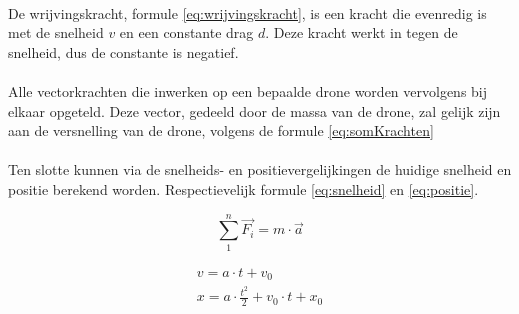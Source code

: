 \\
De wrijvingskracht, formule \ref{eq:wrijvingskracht}, is een kracht die evenredig is met de snelheid \(v\) en een constante drag \(d\). Deze kracht werkt in tegen de snelheid, dus de constante is negatief.\\
\\
Alle vectorkrachten die inwerken op een bepaalde drone worden vervolgens bij elkaar opgeteld. Deze vector, gedeeld door de massa van de drone, zal gelijk zijn aan de versnelling van de drone, volgens de formule \ref{eq:somKrachten} \\
\\
Ten slotte kunnen via de snelheids- en positievergelijkingen de huidige snelheid en positie berekend worden. Respectievelijk formule \ref{eq:snelheid} en \ref{eq:positie}.
\begin{figure}[h]
	\centering
	\begin{minipage}{.49\textwidth}
		\begin{equation}
		\sum_{1}^{n} \vec{F_i} = m \cdot \vec{a} 
		\label{eq:somKrachten}
		\end{equation}
	\end{minipage}
	\begin{minipage}{.49\textwidth}
		\begin{gather}
		v = a\cdot t + v_0 \label{eq:snelheid}\\
		x = a\cdot \frac{t^{2}}{2} + v_0\cdot t + x_0 \label{eq:positie}
		\end{gather}
	\end{minipage}
\end{figure}

